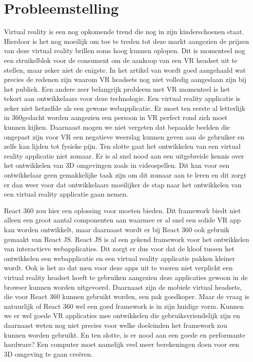 \section{Probleemstelling}
\label{sec:probleemstelling}

Virtual reality is een nog opkomende trend die nog in zijn kinderschoenen staat. Hierdoor is het nog moeilijk om toe te treden tot deze markt aangezien de prijzen van deze virtual reality brillen soms hoog kunnen oplopen. Dit is momenteel nog een struikelblok voor de consument om de aankoop van een VR  headset uit te stellen, maar zeker niet de enigste. In het artikel van \autocite{Abarrera2017} wordt goed aangehaald wat precies de redenen zijn waarom VR headsets nog niet volledig aangeslaan zijn bij het publiek. Een andere zeer belangrijk probleem met VR momenteel is het tekort aan ontwikkelaars voor deze technologie. Een virtual reality applicatie is zeker niet hetzelfde als een gewone webapplicatie. Er moet ten eerste al letterlijk in 360\textdegree  gedacht worden aangezien een persoon in VR perfect rond zich moet kunnen kijken. Daarnaast mogen we niet vergeten dat bepaalde beelden die ongepast zijn voor VR een negatieve weerslag kunnen geven aan de gebruiker en zelfs kan lijden tot fysieke pijn. Ten slotte gaat het ontwikkelen van een virtual reality applicatie niet zomaar. Er is al snel nood aan een uitgebreide kennis over het ontwikkelen van 3D omgevingen zoals in videospellen. Dit kan voor een ontwikkelaar geen gemakkelijke taak zijn om dit zomaar aan te leren en dit zorgt er dan weer voor dat ontwikkelaars moeilijker de stap naar het ontwikkelen van een virtual reality applicatie gaan nemen.

React 360 zou hier een oplossing voor moeten bieden. Dit framework biedt niet alleen een groot aantal componenten aan waarmee er al snel een solide VR app kan worden ontwikkelt, maar daarnaast wordt er bij React 360 ook gebruik gemaakt van React JS. React JS is al een gekend framework voor het ontwikkelen van interactieve webapplicaties. Dit zorgt er dus voor dat de kloof tussen het ontwikkelen een webapplicatie en een virtual reality applicatie pakken kleiner wordt. Ook is het zo dat men voor deze apps uit te voeren niet verplicht een virtual reality headset hoeft te gebruiken aangezien deze applicaties gewoon in de browser kunnen worden uitgevoerd. Daarnaast zijn de mobiele virtual headsets, die voor React 360 kunnen gebruikt worden, een pak goedkoper. Maar de vraag is natuurlijk of React 360 wel een goed framework is in zijn huidige vorm. Kunnen we er wel goede VR applicaties mee ontwikkelen die gebruiksvriendelijk zijn en daarnaast weten nog niet precies voor welke doeleinden het framework zou kunnen worden gebruikt. En ten slotte, is er nood aan een goede en performante hardware? Een computer moet namelijk veel meer berekeningen doen voor een 3D omgeving te gaan creëren.


